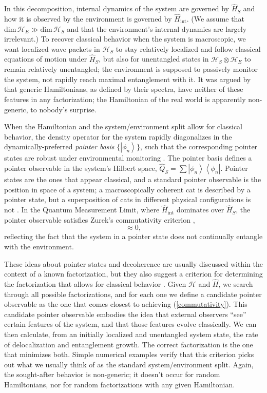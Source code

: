 \documentclass[12pt,english]{article}
\newcommand{\be}{\begin{equation}}
\newcommand{\ee}{\end{equation}}
\newcommand{\ham}{\hat{H}}
\newcommand{\HH}{\mathcal{H}}
\newcommand{\ket}[1]{\left| #1 \right\rangle}
\newcommand{\bra}[1]{\left\langle #1 \right |}
\begin{document}
In this decomposition, internal dynamics of the system are governed by $\ham_S$ and how it is observed by the environment is governed by $\ham_\mathrm{int}$.
(We assume that $\mathrm{dim}\,\HH_E \gg \mathrm{dim}\,\HH_S$ and that the environment's internal dynamics are largely irrelevant.)
To recover classical behavior when the system is macroscopic, we want localized wave packets in $\HH_S$ to stay relatively localized and follow classical equations of motion under $\ham_S$, but also for unentangled states in $\HH_S\otimes \HH_E$ to remain relatively unentangled; the environment is supposed to passively monitor the system, not rapidly reach maximal entanglement with it.
It was argued by \citet{Carroll:2018rhc} that generic Hamiltonians, as defined by their spectra, have neither of these features in any factorization; the Hamiltonian of the real world is apparently non-generic, to nobody's surprise.

When the Hamiltonian and the system/environment split allow for classical behavior, the density operator for the system rapidly diagonalizes in the dynamically-preferred \emph{pointer basis} $\{\ket{\phi_n}\}$, such that the corresponding pointer states are robust under environmental monitoring \citep{Zurek:1981xq}.
The pointer basis defines a pointer observable in the system's Hilbert space, $\hat{Q}_S = \sum \ket{\phi_n}\bra{\phi_n}$.
Pointer states are the ones that appear classical, and a standard pointer observable is the position in space of a system; a macroscopically coherent cat is described by a pointer state, but a superposition of cats in different physical configurations is not \citep{Joos:1984uk,Zurek:1994zq,riedel2012}.
In the Quantum Measurement Limit, where $\ham_\mathrm{int}$ dominates over $\ham_S$, the pointer observable satisfies Zurek's commutativity criterion \citep{Zurek:1981xq},
\be
  [\ham_\mathrm{int}, \hat{Q}_S\otimes \mathbb{I}_E] \approx 0,
  \label{commutativity}
\ee
reflecting the fact that the system in a pointer state does not continually entangle with the environment.

These ideas about pointer states and decoherence are usually discussed within the context of a known factorization, but they also suggest a criterion for determining the factorization that allows for classical behavior \citep{Carroll:2020gme}.
Given $\HH$ and $\ham$, we search through all possible factorizations, and for each one we define a candidate pointer observable as the one that comes closest to achieving (\ref{commutativity}).
This candidate pointer observable embodies the idea that external observers ``see'' certain features of the system, and that those features evolve classically.
We can then calculate, from an initially localized and unentangled system state, the rate of delocalization and entanglement growth.
The correct factorization is the one that minimizes both.
Simple numerical examples verify that this criterion picks out what we usually think of as the standard system/environment split.
Again, the sought-after behavior is non-generic; it doesn't occur for random Hamiltonians, nor for random factorizations with any given Hamiltonian.
\end{document}
